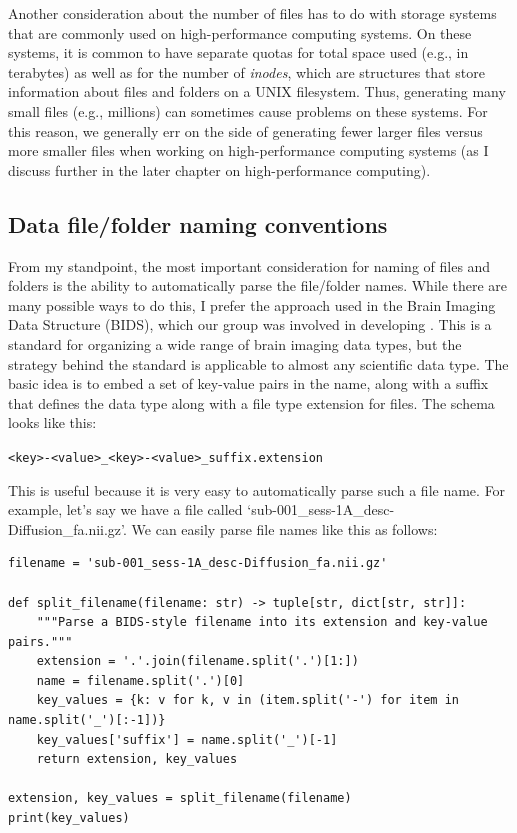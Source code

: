 Another consideration about the number of files has to do with storage systems that are commonly used on high-performance computing systems.  On these systems, it is common to have separate quotas for total space used (e.g., in terabytes) as well as for the number of \textit{inodes}, which are structures that store information about files and folders on a UNIX filesystem. Thus, generating many small files (e.g., millions) can sometimes cause problems on these systems. For this reason, we generally err on the side of generating fewer larger files versus more smaller files when working on high-performance computing systems (as I discuss further in the later chapter on high-performance computing).

\subsection{Data file/folder naming conventions}

From my standpoint, the most important consideration for naming of files and folders is the ability to automatically parse the file/folder names.  While there are many possible ways to do this, I prefer the approach used in the Brain Imaging Data Structure (BIDS), which our group was involved in developing \citep{Gorgolewski:2016aa}.  This is a standard for organizing a wide range of brain imaging data types, but the strategy behind the standard is applicable to almost any scientific data type.  The basic idea is to embed a set of key-value pairs in the name, along with a suffix that defines the data type along with a file type extension for files.  The schema looks like this:

\texttt{\textless key\textgreater-\textless value\textgreater \_\textless key\textgreater-\textless value\textgreater \_suffix.extension}

This is useful because it is very easy to automatically parse such a file name.  For example, let's say we have a file called `sub-001\_sess-1A\_desc-Diffusion\_fa.nii.gz'.  We can easily parse file names like this as follows:

\begin{lstlisting}[style=Python]
filename = 'sub-001_sess-1A_desc-Diffusion_fa.nii.gz'

def split_filename(filename: str) -> tuple[str, dict[str, str]]:
    """Parse a BIDS-style filename into its extension and key-value pairs."""
    extension = '.'.join(filename.split('.')[1:])
    name = filename.split('.')[0]
    key_values = {k: v for k, v in (item.split('-') for item in name.split('_')[:-1])}
    key_values['suffix'] = name.split('_')[-1]
    return extension, key_values

extension, key_values = split_filename(filename)
print(key_values)
\end{lstlisting}

